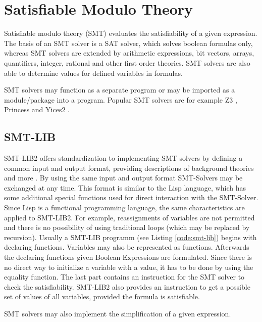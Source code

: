 \section{Satisfiable Modulo Theory}

Satisfiable modulo theory (SMT) evaluates the satisfiability of a given expression. 
The basis of an SMT solver is a SAT solver, which solves boolean formulas only, whereas SMT solvers are extended by arithmetic expressions, bit vectors, arrays, quantifiers, integer, rational and other first order theories. 
SMT solvers are also able to determine values for defined variables in formulas. 


SMT solvers may function as a separate program or may be imported as a module/package into a program. 
Popular SMT solvers are for example Z3 \cite{demouraZ3EfficientSMT2008}, Princess \cite{princess08} and Yices2 \cite{Dutertre:cav2014}.

\subsection{SMT-LIB}
SMT-LIB2 offers standardization to implementing SMT solvers by defining a common input and output format, providing descriptions of background theories and more \cite{cokSMTLIBv2LanguageTools}. %
By using the same input and output format SMT-Solvers may be exchanged at any time. 
This format is similar to the Lisp language, which has some additional special functions used for direct interaction with the SMT-Solver. Since Lisp is a functional programming language, the same characteristics are applied to SMT-LIB2.
For example, reassignments of variables are not permitted and there is no possibility of using traditional loops (which may be replaced by recursion).
Usually a SMT-LIB programm (see Listing \ref{code:smt-lib}) begins with declaring functions. Variables may also be represented as functions. 
Afterwards the declaring functions given Boolean Expressions are formulated. Since there is no direct way to initialize a variable with a value, it has to be done by using the equality function. 
The last part contains an instruction for the SMT solver to check the satisfiability. 
SMT-LIB2 also provides an instruction to get a possible set of values of all variables, provided the formula is satisfiable.

SMT solvers may also implement the simplification of a given expression.


